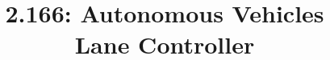\documentclass[11pt]{article}
\begin{document}
\title{2.166: Autonomous Vehicles \\ Lane Controller}
\maketitle


\end{document}
